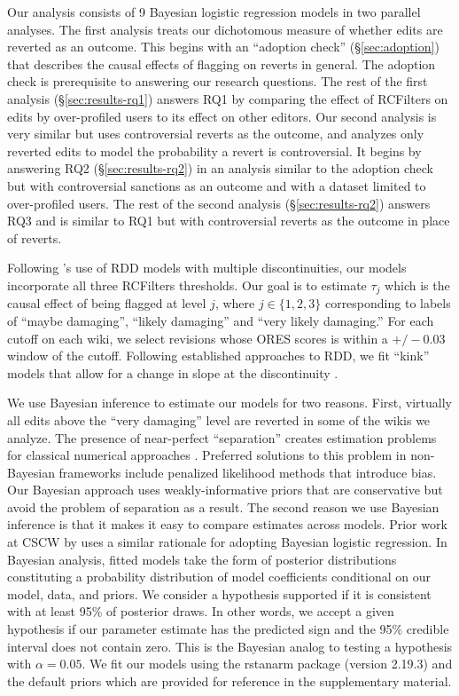 \documentclass[format=acmsmall, natbib=true,  screen=true]{acmart}
\begin{document}
Our analysis consists of 9 Bayesian logistic regression models in two parallel analyses. 
The first analysis treats our dichotomous measure of whether edits are reverted as an outcome. This begins with an ``adoption check'' (§\ref{sec:adoption}) that describes the causal effects of flagging on reverts in general. The adoption check is prerequisite to answering our research questions. The rest of the first analysis (§\ref{sec:results-rq1}) answers RQ1 by comparing the effect of RCFilters on edits by over-profiled users to its effect on other editors. 
Our second analysis is very similar but uses controversial reverts as the outcome, and analyzes only reverted edits to model the probability a revert is controversial. It begins by  answering RQ2 (§\ref{sec:results-rq2}) in an analysis similar to the adoption check but with controversial sanctions as an outcome and with a dataset limited to over-profiled users. The rest of the second analysis (§\ref{sec:results-rq2}) answers RQ3 and is similar to RQ1 but with controversial reverts as the outcome in place of reverts.

Following \citet{litschig_impact_2013}'s use of RDD models with multiple discontinuities, our models incorporate all three RCFilters thresholds.  Our goal is to estimate $\tau_j$ which is the causal effect of being flagged at level $j$, where $j \in \{1,2,3\}$ corresponding to labels of ``maybe damaging'', ``likely damaging'' and ``very likely damaging.'' For each cutoff on each wiki, we select revisions whose ORES scores is within a $+/-0.03$ window of the cutoff.  Following established approaches to RDD, we fit ``kink'' models that allow for a change in slope at the discontinuity \cite{lee_regression_2010, litschig_impact_2013}. 


We use Bayesian inference to estimate our models for two reasons.  First, virtually all edits above the ``very damaging'' level are reverted in some of the wikis we analyze.  The presence of near-perfect ``separation'' creates estimation problems for classical numerical approaches \cite{allison_convergence_2004}. Preferred solutions to this problem in non-Bayesian frameworks include penalized likelihood methods that introduce bias.  Our Bayesian approach uses weakly-informative priors that are conservative but avoid the problem of separation as a result. 
The second reason we use Bayesian inference is that it makes it easy to compare estimates across models. 
Prior work at CSCW by \citet{gan_gender_2018} uses a similar rationale for adopting Bayesian logistic regression.
In Bayesian analysis, fitted models take the form of posterior distributions constituting a probability distribution of model coefficients conditional on our model, data, and priors.  We consider a hypothesis supported if it is consistent with at least 95\% of posterior draws. In other words, we accept a given hypothesis if our parameter estimate has the predicted sign and the 95\% credible interval does not contain zero. This is the Bayesian analog to testing a hypothesis with $\alpha=0.05$.
We fit our models using the rstanarm package (version 2.19.3) and the default priors which are provided for reference in the supplementary material. 
\end{document}
